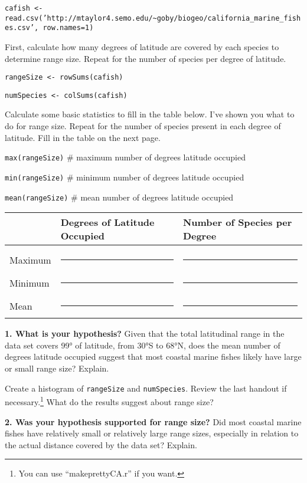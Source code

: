 \documentclass[11pt]{article}
\begin{document}
\texttt{cafish \textless{}-
read.csv('http://mtaylor4.semo.edu/\textasciitilde{}goby/biogeo/california\_marine\_fishes.csv', row.names=1)}

First, calculate how many degrees of latitude are covered by each
species to determine range size. Repeat for the number of species per
degree of latitude.

\texttt{rangeSize \textless{}- rowSums(cafish)}

\texttt{numSpecies \textless{}- colSums(cafish)}

Calculate some basic statistics to fill in the table below. I've shown
you what to do for range size. Repeat for the number of species present
in each degree of latitude. Fill in the table on the next page.

\texttt{max(rangeSize)} \qquad \# maximum number of degrees latitude occupied

\texttt{min(rangeSize)} \qquad \# minimum number of degrees latitude occupied

\texttt{mean(rangeSize)} \qquad \# mean number of degrees latitude occupied

\begin{tabular}[l]{@{}lL{1.6in}L{1.6in}@{}}
\toprule
& Degrees of Latitude Occupied & Number of Species per Degree\tabularnewline
\midrule
 & & \\[1ex]
Maximum & \rule{1.5in}{0.4pt} & \rule{1.5in}{0.4pt} \tabularnewline[2ex]
Minimum & \rule{1.5in}{0.4pt} & \rule{1.5in}{0.4pt} \tabularnewline[2ex]
Mean & \rule{1.5in}{0.4pt} & \rule{1.5in}{0.4pt} \tabularnewline
\bottomrule
\end{tabular}

\textbf{1. What is your hypothesis?} Given that the total latitudinal range in
the data set covers 99° of latitude, from 30°S to 68°N, does the mean
number of degrees latitude occupied suggest that most coastal marine
fishes likely have large or small range size? Explain.

\vspace{7\baselineskip}

Create a histogram of \texttt{rangeSize} and \texttt{numSpecies}. Review the
last handout if necessary.\footnote{You can use ``makeprettyCA.r'' if you want.} 
What do the results suggest about range size?

\textbf{2. Was your hypothesis supported for range size?} Did most coastal marine
fishes have relatively small or relatively large range sizes, especially
in relation to the actual distance covered by the data set? Explain.
\end{document}

